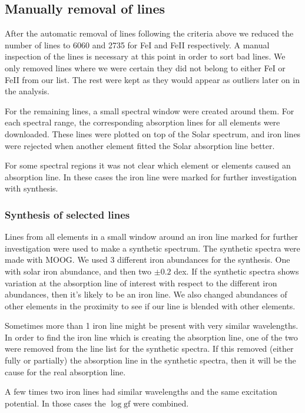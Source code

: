 \documentclass{aa}
\begin{document}
\subsection{Manually removal of lines}
\label{sub:manually_removal_of_lines}
After the automatic removal of lines following the criteria above
we reduced the number of lines to 6060 and 2735 for FeI and FeII
respectively. A manual inspection of the lines is necessary at this
point in order to sort bad lines. We only removed lines where we were
certain they did not belong to either FeI or FeII from our list.
The rest were kept as they would appear as outliers later on in the
analysis.

For the remaining lines, a small spectral window were created around them.
For each spectral range, the corresponding absorption lines for all elements
were downloaded. These lines were plotted on top of the Solar spectrum, and
iron lines were rejected when another element fitted the Solar absorption line
better.

For some spectral regions it was not clear which element or elements
caused an absorption line. In these cases the iron line were marked for further
investigation with synthesis.



\subsubsection{Synthesis of selected lines}
\label{sub:synthesis_of_selected_lines}
Lines from all elements in a small window around an iron line marked
for further investigation were used to make a synthetic spectrum.
The synthetic spectra were made with MOOG. We used 3 different iron
abundances for the synthesis. One with solar iron abundance, and
then two $\pm0.2$ dex. If the synthetic spectra shows variation at
the absorption line of interest with respect to the different iron
abundances, then it's likely to be an iron line. We also changed
abundances of other elements in the proximity to see if our line is
blended with other elements.

Sometimes more than 1 iron line might be present with very similar
wavelengths. In order to find the iron line which is creating the
absorption line, one of the two were removed from the line list for
the synthetic spectra. If this removed (either fully or partially) the
absorption line in the synthetic spectra, then it will be the cause for
the real absorption line.

A few times two iron lines had similar wavelengths and the same excitation
potential. In those cases the $\log \mathrm{gf}$ were combined.
\end{document}
